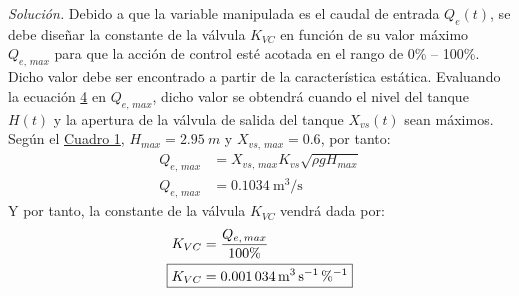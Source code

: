 \textit{Solución.} Debido a que la variable manipulada es el caudal de entrada $Q _{e}(t)$, se debe diseñar la constante de la válvula $K _{VC}$ en función de su valor máximo $Q _{e,\,max}$ para que la acción de control esté acotada en el rango de 0\% -- 100\%. Dicho valor debe ser encontrado a partir de la característica estática. Evaluando la ecuación \hyperref[qe]{4} en $Q _{e,\,max}$, dicho valor se obtendrá cuando el nivel del tanque $H (t)$ y la apertura de la válvula de salida del tanque $X _{vs} (t)$ sean máximos. Según el \hyperref[t1]{Cuadro 1}, $H _{max} = \SI{2.95}{m}$ y $X _{vs,\,max} = 0.6$, por tanto:
\begin{align*}
    Q _{e,\,max} &= X _{vs,\,max} K _{vs} \sqrt{\rho g H _{max}}\\
    Q _{e,\,max} &= \SI{0.1034}{\metre\cubed\per\second}
\end{align*}
Y por tanto, la constante de la válvula $K _{VC}$ vendrá dada por:
\begin{align*}
    K _{VC} &= \frac{Q _{e,\,max}}{100\%}\\
    \Aboxed{K _{VC} &= \SI{0.001034}{\metre\cubed\per\second\per\percent}}
\end{align*}


